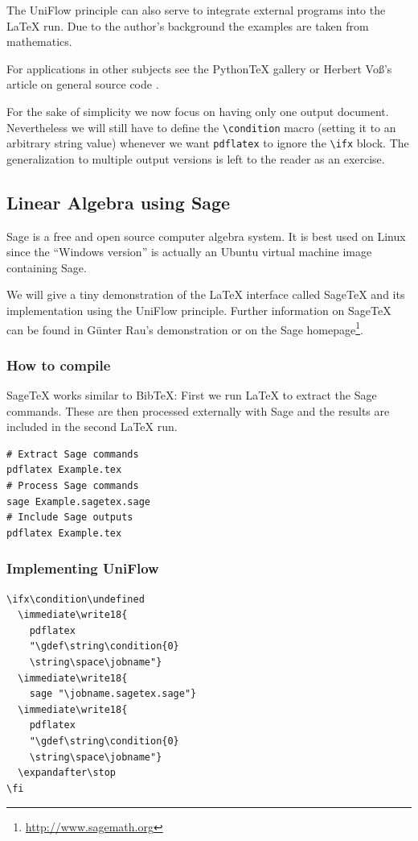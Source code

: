 \documentclass{maps}
\begin{document}
The UniFlow principle can also serve to integrate external programs into the \LaTeX{} run. Due to the author's background the examples are taken from mathematics.

For applications in other subjects see the Python\TeX{} gallery \cite{arn:poore} or Herbert Voß's article on general source code \cite{arn:voss}.

For the sake of simplicity we now focus on having only one output document. Nevertheless we will still have to define the \verb+\condition+ macro (setting it to an arbitrary string value) whenever we want \texttt{pdflatex} to ignore the \verb+\ifx+ block. The generalization to multiple output versions is left to the reader as an exercise.

\subsection{Linear Algebra using Sage}

Sage is a free and open source computer algebra system. It is best used on Linux since the \enquote{Windows version} is actually an Ubuntu virtual machine image containing Sage.

We will give a tiny demonstration of the \LaTeX{} interface called Sage\TeX{} and its implementation using the UniFlow principle. Further information on Sage\TeX{} can be found in Günter Rau's demonstration \cite{arn:rau} or on the Sage homepage\footnote{\url{http://www.sagemath.org}}.

\subsubsection{How to compile}
Sage\TeX{} works similar to Bib\TeX{}: First we run \LaTeX{} to extract the Sage commands. These are then processed externally with Sage and the results are included in the second \LaTeX{} run.

\begin{lstlisting}[style=arn:lst:bash]
# Extract Sage commands
pdflatex Example.tex
# Process Sage commands
sage Example.sagetex.sage
# Include Sage outputs
pdflatex Example.tex
\end{lstlisting}

\subsubsection{Implementing UniFlow} \strut

\begin{lstlisting}[language={[LaTeX]TeX}, style=arn:lst]
\ifx\condition\undefined
  \immediate\write18{
    pdflatex
    "\gdef\string\condition{0}
    \string\space\jobname"}
  \immediate\write18{
    sage "\jobname.sagetex.sage"}
  \immediate\write18{
    pdflatex
    "\gdef\string\condition{0}
    \string\space\jobname"}
  \expandafter\stop
\fi
\end{lstlisting}
\end{document}
